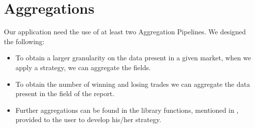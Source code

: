 \section{Aggregations}\label{sec:aggregations}

Our application need the use of at least two Aggregation Pipelines. We designed
the following:
\begin{itemize}
	\item To obtain a larger granularity on the data present in a given
		market, when we apply a strategy, we can aggregate the
		 fields.
	\item To obtain the number of winning and losing trades we can aggregate
		the data present in the  field of the report.
	\item Further aggregations can be found in the library functions,
		mentioned in , provided to the user to develop
		his/her strategy.
\end{itemize}
